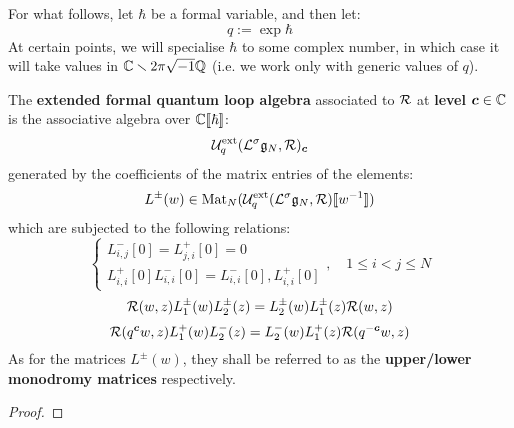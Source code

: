         For what follows, let $\hbar$ be a formal variable, and then let:
            $$q := \exp \hbar$$
        At certain points, we will specialise $\hbar$ to some complex number, in which case it will take values in $\mathbb{C} \smallsetminus 2\pi \sqrt{-1} \mathbb{Q}$ (i.e. we work only with generic values of $q$).
        \begin{definition} \label{def: extended_loop_QUEs_R_matrix_presentation}
            The \textbf{extended formal quantum loop algebra} associated to $\mathcal{R}$ at \textbf{level $\boldsymbol{c} \in \mathbb{C}$} is the associative algebra over $\mathbb{C}[\![\hbar]\!]$:
                $$\mathcal{U}_q^{\mathrm{ext}}(\mathcal{L}^{\sigma}\mathfrak{g}_N, \mathcal{R})_{\boldsymbol{c}}$$
            generated by the coefficients of the matrix entries of the elements:
                $$L^{\pm}(w) \in \operatorname{Mat}_N( \mathcal{U}_q^{\mathrm{ext}}(\mathcal{L}^{\sigma}\mathfrak{g}_N, \mathcal{R})[\![w^{-1}]\!] )$$
            which are subjected to the following relations:
                $$
                    \begin{cases}
                        L_{i, j}^-[0] = L_{j, i}^+[0] = 0
                        \\
                        L_{i, i}^+[0] L_{i, i}^-[0] = L_{i, i}^-[0], L_{i, i}^+[0]
                    \end{cases}, \quad 1 \leq i < j \leq N
                $$
                \begin{equation} \label{equation: extended_loop_QUE_RLL_relation}
                    \mathcal{R}(w, z) L_1^{\pm}(w) L_2^{\pm}(z) = L_2^{\pm}(w) L_1^{\pm}(z) \mathcal{R}(w, z)
                \end{equation}
                \begin{equation} \label{equation: extended_loop_QUEs_mixed_relation}
                    \mathcal{R}(q^{\boldsymbol{c}}w, z) L_1^+(w) L_2^-(z) = L_2^-(w) L_1^+(z) \mathcal{R}(q^{-\boldsymbol{c}}w, z)
                \end{equation}
            As for the matrices $L^{\pm}(w)$, they shall be referred to as the \textbf{upper/lower monodromy matrices} respectively. 
        \end{definition}
        \begin{definition} \label{def: loop_QUEs_R_matrix_presentation}
            
        \end{definition}

        \begin{lemma} \label{lemma: centres_of_loop_QUEs}
            
        \end{lemma}
            \begin{proof}
                
            \end{proof}

